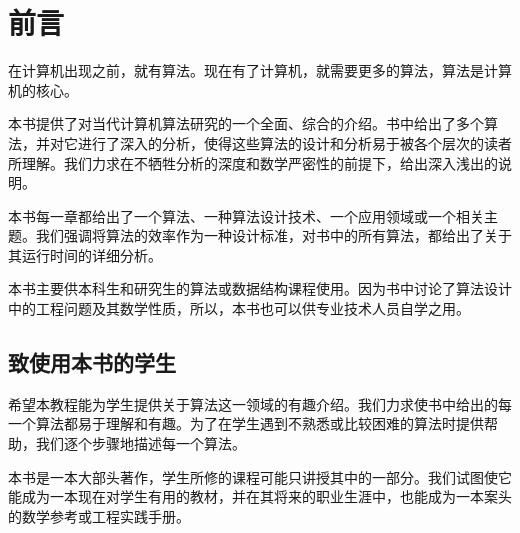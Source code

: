 \chapter{前言}
在计算机出现之前，就有算法。现在有了计算机，就需要更多的算法，算法是计算机的核心。
\par 本书提供了对当代计算机算法研究的一个全面、综合的介绍。书中给出了多个算法，并对它进行了深入的分析，使得这些算法的设计和分析易于被各个层次的读者所理解。我们力求在不牺牲分析的深度和数学严密性的前提下，给出深入浅出的说明。
\par 本书每一章都给出了一个算法、一种算法设计技术、一个应用领域或一个相关主题。我们强调将算法的效率作为一种设计标准，对书中的所有算法，都给出了关于其运行时间的详细分析。
\par 本书主要供本科生和研究生的算法或数据结构课程使用。因为书中讨论了算法设计中的工程问题及其数学性质，所以，本书也可以供专业技术人员自学之用。
\section{致使用本书的学生}
希望本教程能为学生提供关于算法这一领域的有趣介绍。我们力求使书中给出的每一个算法都易于理解和有趣。为了在学生遇到不熟悉或比较困难的算法时提供帮助，我们逐个步骤地描述每一个算法。
\par 本书是一本大部头著作，学生所修的课程可能只讲授其中的一部分。我们试图使它能成为一本现在对学生有用的教材，并在其将来的职业生涯中，也能成为一本案头的数学参考或工程实践手册。